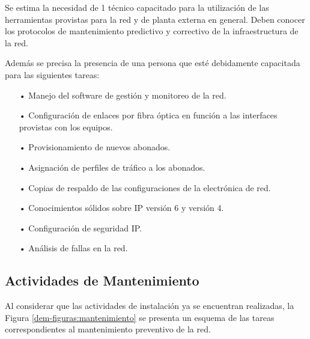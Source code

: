 Se estima la necesidad de 1 técnico capacitado para la utilización de las herramientas provistas para la red y de planta externa en general. Deben conocer los protocolos de mantenimiento predictivo y correctivo de la infraestructura de la red. 


Además se precisa la presencia de una persona que esté debidamente capacitada para las siguientes tareas:

\begin{itemize}

\item[•]Manejo del software de gestión y monitoreo de la red.

\item[•]Configuración de enlaces por fibra óptica en función a las interfaces provistas con los equipos. 

\item[•]Provisionamiento de nuevos abonados. 

\item[•]Asignación de perfiles de tráfico a los abonados. 

\item[•]Copias de respaldo de las configuraciones de la electrónica de red. 


\item[•]Conocimientos sólidos sobre IP versión 6 y versión 4.


\item[•]Configuración de seguridad IP.

\item[•]Análisis de fallas en la red.


\end{itemize}








\subsection{Actividades de Mantenimiento}
Al considerar que las actividades de instalación ya se encuentran realizadas, la Figura \ref{dem-figuras:mantenimiento} se presenta un esquema de las tareas correspondientes al mantenimiento preventivo de la red.


